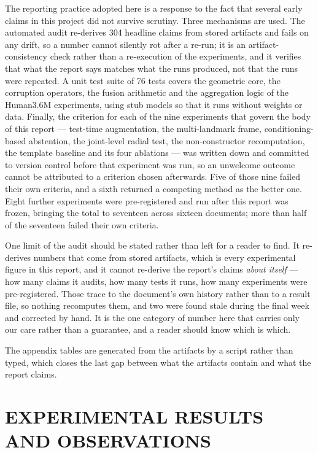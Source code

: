 \documentclass[12pt,a4paper]{report}
\begin{document}
The reporting practice adopted here is a response to the fact that several early claims in this project did not survive scrutiny. Three mechanisms are used. The automated audit re-derives 304 headline claims from stored artifacts and fails on any drift, so a number cannot silently rot after a re-run; it is an artifact-consistency check rather than a re-execution of the experiments, and it verifies that what the report says matches what the runs produced, not that the runs were repeated. A unit test suite of 76 tests covers the geometric core, the corruption operators, the fusion arithmetic and the aggregation logic of the Human3.6M experiments, using stub models so that it runs without weights or data. Finally, the criterion for each of the nine experiments that govern the body of this report --- test-time augmentation, the multi-landmark frame, conditioning-based abstention, the joint-level radial test, the non-constructor recomputation, the template baseline and its four ablations --- was written down and committed to version control before that experiment was run, so an unwelcome outcome cannot be attributed to a criterion chosen afterwards. Five of those nine failed their own criteria, and a sixth returned a competing method as the better one. Eight further experiments were pre-registered and run after this report was frozen, bringing the total to seventeen across sixteen documents; more than half of the seventeen failed their own criteria.

One limit of the audit should be stated rather than left for a reader to find. It re-derives numbers that come from stored artifacts, which is every experimental figure in this report, and it cannot re-derive the report's claims \emph{about itself} --- how many claims it audits, how many tests it runs, how many experiments were pre-registered. Those trace to the document's own history rather than to a result file, so nothing recomputes them, and two were found stale during the final week and corrected by hand. It is the one category of number here that carries only our care rather than a guarantee, and a reader should know which is which.

The appendix tables are generated from the artifacts by a script rather than typed, which closes the last gap between what the artifacts contain and what the report claims.

\chapter{EXPERIMENTAL RESULTS AND OBSERVATIONS}
\end{document}
